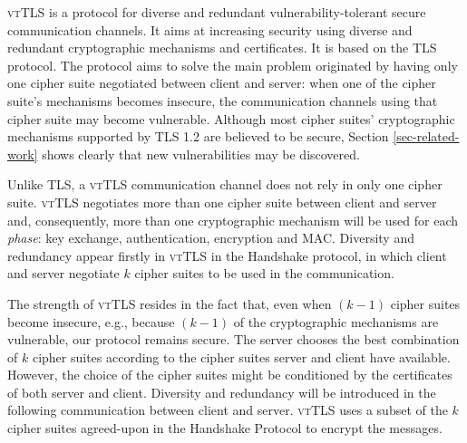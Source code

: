 \documentclass{sig-alternate-05-2015}
\begin{document}
\textsc{vtTLS} is a protocol for diverse and redundant vulnerabi\-li\-ty-tolerant secure communication channels. It aims at increasing security using diverse and redundant cryptographic mechanisms and certificates. It is based on the TLS protocol. 
The protocol aims to solve the main problem originated by having only one cipher suite negotiated between client and server: when one of the cipher suite's mechanisms becomes insecure, the communication channels using that cipher suite may become vulnerable.
Although most cipher suites' cryptographic mechanisms supported by TLS 1.2 are believed to be secure, Section \ref{sec-related-work} shows clearly that new vulnerabilities may be discovered. 

Unlike TLS, a \textsc{vtTLS} communication channel does not rely in only one cipher suite. \textsc{vtTLS} negotiates more than one cipher suite between client and server and, consequently, more than one cryptographic mechanism will be used for each \emph{phase}: key exchange, authentication, encryption and MAC.
%
Diversity and redundancy appear firstly in \textsc{vtTLS} in the Handshake protocol, in which client and server negotiate $k$ cipher suites to be used in the communication.

The strength of \textsc{vtTLS} resides in the fact that, even when $(k - 1)$ cipher suites become insecure, e.g., because $(k-1)$ of the  cryptographic mechanisms are vulnerable, our protocol remains secure. %
The server chooses the best combination of $k$ cipher suites according to the cipher suites server and client have available. However, the choice of the cipher suites might be conditioned by the certificates of both server and client.
Diversity and redundancy will  be introduced in the following communication between client and server. \textsc{vtTLS} uses a subset of the $k$ cipher suites agreed-upon in the Handshake Protocol to encrypt the messages.
\end{document}
